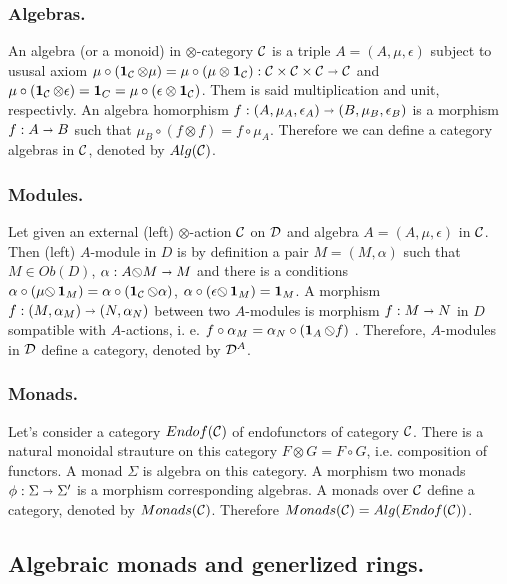 		\subsubsection{Algebras.} An algebra (or a monoid) in $\otimes$-category $\mathcal{C}$ is a triple $ A = (A, \mu, \epsilon) $
		subject to ususal axiom $ \mu \circ (\operatorname*{\textbf{1}}_{\mathcal{C}} \otimes \mu) = \mu \circ (\mu \otimes \operatorname*{\textbf{1}}_{\mathcal{C}}) : 
		\mathcal{C} \times \mathcal{C} \times  \mathcal{C} \shortrightarrow \mathcal{C} $ and $ \mu \circ (\operatorname*{\textbf{1}}_{\mathcal{C}} \otimes \epsilon) = \operatorname*{\textbf{1}}_{C} =
		\mu \circ (\epsilon \otimes \operatorname*{\textbf{1}}_{\mathcal{C}}) $. Them is said multiplication and unit, respectivly. An algebra homorphism
		$ f : (A, \mu_{A}, \epsilon_{A}) \shortrightarrow (B, \mu_{B}, \epsilon_{B}) $ is a morphism $ f : A \shortrightarrow B $ such that
		$ \mu_{B} \circ (f \otimes f) = f \circ \mu_{A} $. Therefore we can define a category algebras in $\mathcal{C}$,
		denoted by $ Alg(\mathcal{C}) $.
		\subsubsection{Modules.} Let given an external (left) $\otimes$-action $\mathcal{C}$ on $\mathcal{D}$ and algebra 
		$ A = (A, \mu, \epsilon) $ in $\mathcal{C}$. Then (left) $A$-module in $D$ is by definition a pair $ M = (M, \alpha) $ such that
		$ M \in Ob(D)$, $\alpha : A \rosl M \rarr M $ and there is a conditions 
		$ \alpha \circ (\mu \rosl \oid_M) = \alpha \circ (\oid_\mc{C} \rosl \alpha)$, 
		$ \alpha \circ (\epsilon \rosl \oid_{M}) = \oid_{M} $. A morphism $ f : (M, \alpha_{M}) \shortrightarrow (N, \alpha_{N}) $
		between two $A$-modules is morphism $ f : M \shortrightarrow N $ in $D$ sompatible with $A$-actions, i. e.
		$ f \circ \alpha_{M} = \alpha_{N} \circ (\oid_{A} \rosl f)  $ . Therefore, $A$-modules in $\mathcal{D}$ define a category,
		denoted by $ \mathcal{D}^A $.
		\subsubsection{Monads.} Let's consider a category $Endof(\mathcal{C})$ of endofunctors of category $\mathcal{C}$.
		There is a natural monoidal strauture on this category $ F \otimes G = F \circ G $, i.e. composition of functors.
		A monad $\Sigma$ is algebra on this category. A morphism two monads $ \phi : \Sigma \shortrightarrow \Sigma' $ is a morphism
		corresponding algebras. A monads over $\mathcal{C}$ define a category, denoted by $ Monads(\mathcal{C}) $. Therefore
		$ Monads(\mathcal{C}) = Alg(Endof(\mathcal{C})) $.
		
	\subsection{Algebraic monads and generlized rings.}

